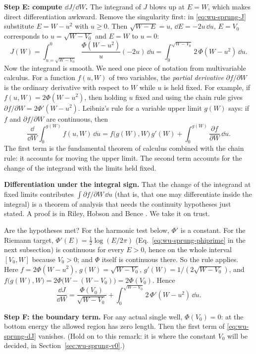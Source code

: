 \textbf{Step E: compute $\dd J/\dd W$.} The integrand of $J$ blows up at $E=W$, which makes direct differentiation awkward. Remove the singularity first: in \eqref{eq:wu-sprung-J} substitute $E=W-u^2$ with $u\ge0$. Then $\sqrt{W-E}=u$, $\dd E=-2u\,\dd u$, $E=V_0$ corresponds to $u=\sqrt{W-V_0}$ and $E=W$ to $u=0$:
\[
J(W)=\int_{u=\sqrt{W-V_0}}^{0}\frac{\Phi(W-u^2)}{u}(-2u)\,\dd u=\int_0^{\sqrt{W-V_0}}2\,\Phi(W-u^2)\,\dd u .
\]
Now the integrand is smooth. We need one piece of notation from multivariable calculus. For a function $f(u,W)$ of two variables, the \emph{partial derivative} $\partial f/\partial W$ is the ordinary derivative with respect to $W$ while $u$ is held fixed. For example, if $f(u,W)=2\Phi(W-u^2)$, then holding $u$ fixed and using the chain rule gives $\partial f/\partial W=2\Phi'(W-u^2)$. Leibniz's rule for a variable upper limit $g(W)$ says: if $f$ and $\partial f/\partial W$ are continuous, then
\[
\frac{\dd}{\dd W}\int_0^{g(W)}f(u,W)\,\dd u=f\bigl(g(W),W\bigr)\,g'(W)+\int_0^{g(W)}\frac{\partial f}{\partial W}\,\dd u .
\]
The first term is the fundamental theorem of calculus combined with the chain rule: it accounts for moving the upper limit. The second term accounts for the change of the integrand with the limits held fixed.
\begin{beyond}
\textbf{Differentiation under the integral sign.} That the change of the integrand at fixed limits contributes $\int\partial f/\partial W\,\dd u$ (that is, that one may differentiate inside the integral) is a theorem of analysis that needs the continuity hypotheses just stated. A proof is in Riley, Hobson and Bence \cite{rhb}. We take it on trust.
\end{beyond}
Are the hypotheses met? For the harmonic test below, $\Phi'$ is a constant. For the Riemann target, $\Phi'(E)=\tfrac12\log(E/2\pi)$ (Eq.~\eqref{eq:wu-sprung-phiprime} in the next subsection) is continuous for every $E>0$, hence on the whole interval $[V_0,W]$ because $V_0>0$; and $\Phi$ itself is continuous there. So the rule applies. Here $f=2\Phi(W-u^2)$, $g(W)=\sqrt{W-V_0}$, $g'(W)=1/(2\sqrt{W-V_0})$, and $f\bigl(g(W),W\bigr)=2\Phi\bigl(W-(W-V_0)\bigr)=2\Phi(V_0)$. Hence
\begin{equation}
\frac{\dd J}{\dd W}=\frac{\Phi(V_0)}{\sqrt{W-V_0}}+\int_0^{\sqrt{W-V_0}}2\,\Phi'(W-u^2)\,\dd u .
\label{eq:wu-sprung-dJ}
\end{equation}

\textbf{Step F: the boundary term.} For any actual single well, $\Phi(V_0)=0$: at the bottom energy the allowed region has zero length. Then the first term of \eqref{eq:wu-sprung-dJ} vanishes. (Hold on to this remark: it is where the constant $V_0$ will be decided, in Section~\ref{sec:wu-sprung-v0}.)

